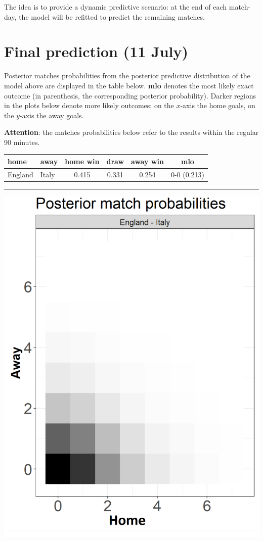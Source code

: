\documentclass[
  10pt,
]{article}
\begin{document}
The idea is to provide a dynamic predictive scenario: at the end of each
match-day, the model will be refitted to predict the remaining matches.

\hypertarget{final-prediction-11-july}{%
\section{Final prediction (11 July)}\label{final-prediction-11-july}}

Posterior matches probabilities from the posterior predictive
distribution of the model above are displayed in the table below.
\textbf{mlo} denotes the most likely exact outcome (in parenthesis, the
corresponding posterior probability). Darker regions in the plots below
denote more likely outcomes: on the \(x\)-axis the home goals, on the
\(y\)-axis the away goals.

\textbf{Attention}: the matches probabilities below refer to the results
within the regular 90 minutes.

\begin{longtable}[]{@{}llcccc@{}}
\toprule
home & away & home win & draw & away win & mlo\tabularnewline
\midrule
\endhead
England & Italy & 0.415 & 0.331 & 0.254 & 0-0 (0.213)\tabularnewline
\bottomrule
\end{longtable}

\begin{center}\rule{0.5\linewidth}{0.5pt}\end{center}

\begin{center}\includegraphics[width=0.5\linewidth]{figs/data2-1bis} \end{center}
\end{document}
